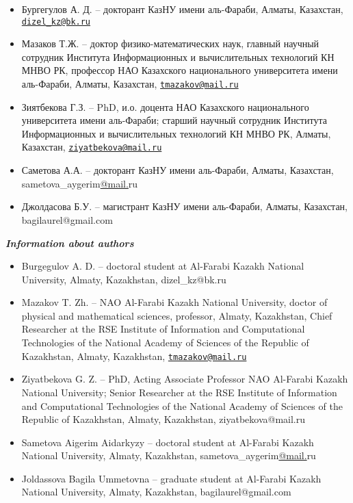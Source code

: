 \begin{itemize}
\item
Бургегулов А. Д. -- докторант КазНУ имени аль-Фараби, Алматы, Казахстан,
\href{mailto:dizel_kz@bk.ru}{\nolinkurl{dizel\_kz@bk.ru}}

\item
Мазаков Т.Ж. -- доктор физико-математических наук, главный научный
сотрудник Института Информационных и вычислительных технологий КН МНВО
РК, профессор НАО Казахского национального университета имени
аль-Фараби, Алматы, Казахстан,
\href{mailto:tmazakov@mail.ru}{\nolinkurl{tmazakov@mail.ru}}

\item
Зиятбекова Г.З. -- PhD, и.о. доцента НАО Казахского национального
университета имени аль-Фараби; старший научный сотрудник Института
Информационных и вычислительных технологий КН МНВО РК, Алматы,
Казахстан,
\href{mailto:ziyatbekova@mail.ru}{\nolinkurl{ziyatbekova@mail.ru}}

\item
Саметова А.А. -- докторант КазНУ имени аль-Фараби, Алматы, Казахстан,
sametova\_aygerim\href{mailto:amirkhanov.b@gmail.com}{@mail.}ru

\item
Джолдасова Б.У. -- магистрант КазНУ имени аль-Фараби, Алматы, Казахстан,
bagilaurel@gmail.com
\end{itemize}

\emph{{\bfseries Information about authors}}

\begin{itemize}
\item
Burgegulov A. D. -- doctoral student at Al-Farabi Kazakh National
University, Almaty, Kazakhstan, dizel\_kz@bk.ru

\item
Mazakov T. Zh. -- NAO Al-Farabi Kazakh National University, doctor of
physical and mathematical sciences, professor, Almaty, Kazakhstan, Chief
Researcher at the RSE Institute of Information and Computational
Technologies of the National Academy of Sciences of the Republic of
Kazakhstan, Almaty, Kazakhstan,
\href{mailto:tmazakov@mail.ru}{\nolinkurl{tmazakov@mail.ru}}

\item
Ziyatbekova G. Z. -- PhD, Acting Associate Professor NAO Al-Farabi
Kazakh National University; Senior Researcher at the RSE Institute of
Information and Computational Technologies of the National Academy of
Sciences of the Republic of Kazakhstan, Almaty, Kazakhstan,
ziyatbekova@mail.ru

\item
Sametova Aigerim Aidarkyzy -- doctoral student at Al-Farabi Kazakh
National University, Almaty, Kazakhstan,
sametova\_aygerim\href{mailto:amirkhanov.b@gmail.com}{@mail.}ru

\item
Joldassova Bagila Ummetovna -- graduate student at Al-Farabi Kazakh
National University, Almaty, Kazakhstan, bagilaurel@gmail.com
\end{itemize}
